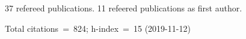 37 refereed publications. 11 refeered publications as first author.

Total citations~=~824; h-index~=~15 (2019-11-12)